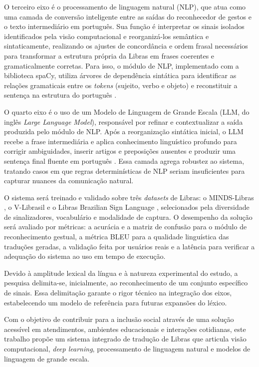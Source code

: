 \documentclass[
    12pt,                %
    openright,           %
    oneside,             %
    a4paper,             %
    english,             %
    brazil               %
]{abntex2}
\begin{document}
O terceiro eixo é o processamento de linguagem natural (NLP), que atua como uma camada de conversão inteligente entre as saídas do reconhecedor de gestos e o texto intermediário em português. Sua função é interpretar os sinais isolados identificados pela visão computacional e reorganizá-los semântica e sintaticamente, realizando os ajustes de concordância e ordem frasal necessários para transformar a estrutura própria da Libras em frases coerentes e gramaticalmente corretas. Para isso, o módulo de NLP, implementado com a biblioteca spaCy, utiliza árvores de dependência sintática para identificar as relações gramaticais entre os \textit{tokens} (sujeito, verbo e objeto) e reconstituir a sentença na estrutura do português \cite{Jurafsky2023}.

O quarto eixo é o uso de um Modelo de Linguagem de Grande Escala (LLM, do inglês \textit{Large Language Model}), responsável por refinar e contextualizar a saída produzida pelo módulo de NLP. Após a reorganização sintática inicial, o LLM recebe a frase intermediária e aplica conhecimento linguístico profundo para corrigir ambiguidades, inserir artigos e preposições ausentes e produzir uma sentença final fluente em português \cite{Brown2020}. Essa camada agrega robustez ao sistema, tratando casos em que regras determinísticas de NLP seriam insuficientes para capturar nuances da comunicação natural.

O sistema será treinado e validado sobre três \textit{datasets} de Libras: o MINDS-Libras \cite{Rezende2021}, o V-Librasil \cite{Rodrigues2021} e o Libras Brazilian Sign Language \cite{Pas2020}, selecionados pela diversidade de sinalizadores, vocabulário e modalidade de captura. O desempenho da solução será avaliado por métricas: a acurácia e a matriz de confusão para o módulo de reconhecimento gestual, a métrica BLEU \cite{Papineni2002} para a qualidade linguística das traduções geradas, a validação feita por usuários reais e a latência para verificar a adequação do sistema ao uso em tempo de execução.

Devido à amplitude lexical da língua e à natureza experimental do estudo, a pesquisa delimita-se, inicialmente, ao reconhecimento de um conjunto específico de sinais. Essa delimitação garante o rigor técnico na integração dos eixos, estabelecendo um modelo de referência para futuras expansões do léxico.

Com o objetivo de contribuir para a inclusão social através de uma solução acessível em atendimentos, ambientes educacionais e interações cotidianas, este trabalho propõe um sistema integrado de tradução de Libras que articula visão computacional, \textit{deep learning}, processamento de linguagem natural e modelos de linguagem de grande escala.
\end{document}
